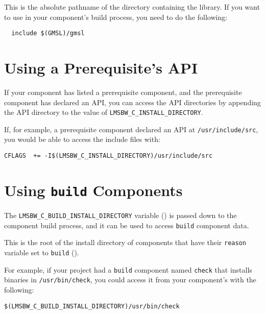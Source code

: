 This is the absolute pathname of the directory containing the \gmsl
library.  If you want to use \gmsl in your component's build process,
you need to do the following:

\begin{verbatim}
  include $(GMSL)/gmsl
\end{verbatim}

\section{Using a Prerequisite's API}\label{wrap:using-prerequisite-api}

If your component has listed a prerequisite component, and the
prerequisite component has declared an API, you can access the API
directories by appending the API directory to the value of
\texttt{LMSBW\_C\_INSTALL\_DIRECTORY}.

If, for example, a prerequisite component declared an API at
\texttt{/usr/include/src}, you would be able to access the
include files with:

\begin{verbatim}
CFLAGS  += -I$(LMSBW_C_INSTALL_DIRECTORY)/usr/include/src
\end{verbatim}

\section{Using \texttt{build} Components}\label{wrap:using-build-components}

The \texttt{LMSBW\_C\_BUILD\_INSTALL\_DIRECTORY} variable
() is passed down to the component
build process, and it can be used to access \texttt{build} component
data.

This is the root of the install directory of components that have
their \texttt{reason} variable set to \texttt{build}
().

For example, if your project had a \texttt{build} component named
\texttt{check} that installs binaries in \texttt{/usr/bin/check}, you
could access it from your component's \makefile with the following:

\begin{verbatim}
$(LMSBW_C_BUILD_INSTALL_DIRECTORY)/usr/bin/check
\end{verbatim}
